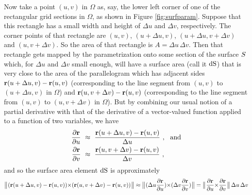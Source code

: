 Now take a point $(u,v)$ in $\Omega$ as, say,
the lower left corner of one of the rectangular grid sections in $\Omega$, as shown in Figure \ref{fig:surfparam}. Suppose
that this rectangle has a small width and height of $\Delta u$ and $\Delta v$, respectively. The corner points of that
rectangle are $(u,v)$, $(u+\Delta u,v)$, $(u+\Delta u,v+\Delta v)$ and $(u,v+\Delta v)$.
So the area of that
rectangle is $A = \Delta u\,\Delta v$. Then that rectangle gets mapped by the parametrization onto some section of the
surface $S$ which, for $\Delta u$ and $\Delta v$ small enough, will have a surface area (call it $ \d \S$) that
is very close to the area of the parallelogram which has adjacent sides $\mathbf{ r}(u+\Delta u,v) - \mathbf{ r}(u,v)$
(corresponding to the line segment from $(u,v)$ to $(u+\Delta u,v)$ in $\Omega$) and
$\mathbf{ r}(u,v+\Delta v) - \mathbf{ r}(u,v)$ (corresponding to the line segment from $(u,v)$ to $(u,v+\Delta v)$ in
$\Omega$). But by combining our usual notion of a partial derivative  with that of the derivative of a vector-valued function  applied to a function of two variables, we have
\begin{align*}
 \dfrac{\partial \vector{r}}{\partial u} ~&\approx~ \dfrac{\vector{r}(u+\Delta u,v) - \vector{r}(u,v)}{\Delta u}
 ~,~~\text{and}\vspace{1mm}\\
 \dfrac{\partial \vector{r}}{\partial v} ~&\approx~ \dfrac{\vector{r}(u,v+\Delta v) - \vector{r}(u,v)}{\Delta v} ~,
\end{align*}
and so the surface area element $ \d \S$ is approximately
\begin{displaymath}
 \bigl\lVert\mspace{1mu}(\mathbf{ r}(u+\Delta u,v) - \mathbf{ r}(u,v)) \mathbf{\times} (\mathbf{ r}(u,v+\Delta v) - \mathbf{ r}(u,v))\mspace{1mu}\bigr\rVert \approx
\bigl\lVert\mspace{1mu}(\Delta u \dfrac{\partial \mathbf{ r}}{\partial u}) \mathbf{\times} (\Delta v\dfrac{\partial \mathbf{ r}}{\partial v})\mspace{1mu}\bigr\rVert
 =\bigl\lVert\mspace{1mu}\dfrac{\partial \mathbf{ r}}{\partial u} \mathbf{\times} \dfrac{\partial \mathbf{ r}}{\partial v}\mspace{1mu}\bigr\rVert\,
 \Delta u \, \Delta v
\end{displaymath}

